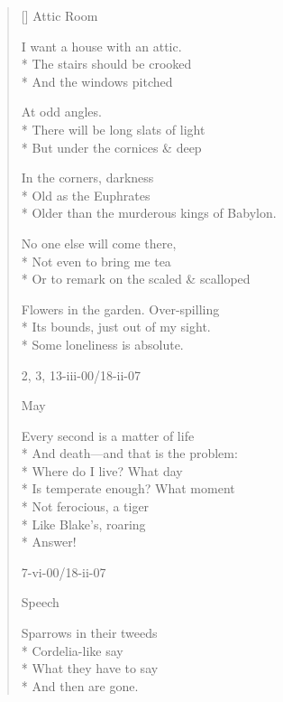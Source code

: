 \label{ch:solitudes}
\settowidth{\versewidth}{Older than the murderous kings of Babylon.}
\begin{verse}[\versewidth]
 \qquad Attic Room

I want a house with an attic.\\*
The stairs should be crooked\\*
And the windows pitched

At odd angles.\\*
There will be long slats of light\\*
But under the cornices \& deep

In the corners, darkness\\*
Old as the Euphrates\\*
Older than the murderous kings of Babylon.

No one else will come there,\\*
Not even to bring me tea\\*
Or to remark on the scaled \& scalloped

Flowers in the garden. Over-spilling\\*
Its bounds, just out of my sight.\\*
Some loneliness is absolute.

2, 3, 13-iii-00/18-ii-07

 \qquad 

                           May

Every second is a matter of life\\*
And death---and that is the problem:\\*
Where do I live? What day\\*
Is temperate enough? What moment\\*
Not ferocious, a tiger\\*
Like Blake's, roaring\\*
Answer!

7-vi-00/18-ii-07

 \qquad Speech

Sparrows in their tweeds\\*
Cordelia-like say\\*
What they have to say\\*
And then are gone.
\end{verse}
